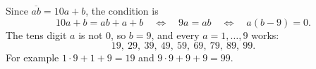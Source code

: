 Since $\overline{ab}=10a+b$, the condition is
\[
10a+b=ab+a+b\quad\Longleftrightarrow\quad 9a=ab\quad\Longleftrightarrow\quad a(b-9)=0 .
\]
The tens digit $a$ is not $0$, so $b=9$, and every $a=1,\dots,9$ works:
\[
\boxed{19,\ 29,\ 39,\ 49,\ 59,\ 69,\ 79,\ 89,\ 99}.
\]
For example $1\cdot9+1+9=19$ and $9\cdot9+9+9=99$.
